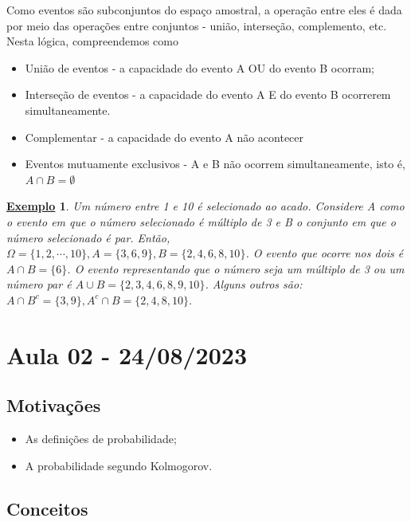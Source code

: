 \documentclass{article}
\newtheorem{example}{\underline{Exemplo}}
\begin{document}
Como eventos são subconjuntos do espaço amostral, a operação entre eles é dada por meio das operações entre conjuntos - 
união, interseção, complemento, etc. Nesta lógica, compreendemos como
\begin{itemize}
  \item[] União de eventos - a capacidade do evento A OU do evento B ocorram;
  \item[] Interseção de eventos - a capacidade do evento A E do evento B ocorrerem simultaneamente.
  \item[] Complementar - a capacidade do evento A não acontecer
  \item[] Eventos mutuamente exclusivos - A e B não ocorrem simultaneamente, isto é, \(A\cap B = \emptyset\)
\end{itemize}
\begin{example}
  Um número entre 1 e 10 é selecionado ao acado. Considere A como o evento em que o número selecionado é múltiplo de 3 e B o conjunto em que o número selecionado é par. Então, 
  \(\Omega = \{1, 2, \cdots, 10\}, A = \{3, 6, 9\}, B = \{2, 4, 6, 8, 10\}\). O evento que ocorre nos dois é \(A\cap B=\{6\}\). O evento representando que o número seja um múltiplo de 3 ou
  um número par é \(A\cup B = \{2, 3, 4, 6, 8, 9, 10\}\). Alguns outros são: \(A\cap B^{c} = \{3, 9\}, A^{c}\cap B = \{2, 4, 8, 10\}.\)
\end{example}
\newpage
\section{Aula 02 - 24/08/2023}
\subsection{Motivações}
\begin{itemize}
  \item As definições de probabilidade;
  \item A probabilidade segundo Kolmogorov.
\end{itemize}
\subsection{Conceitos}
\end{document}
